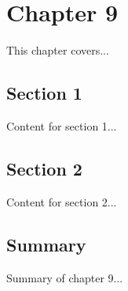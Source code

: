 \chapter{Chapter 9}

This chapter covers...

\section{Section 1}

Content for section 1...

\section{Section 2}

Content for section 2...

\section{Summary}

Summary of chapter 9...

